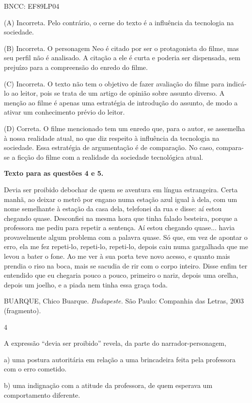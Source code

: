 BNCC: EF89LP04

(A) Incorreta. Pelo contrário, o cerne do texto é a influência da
tecnologia na sociedade.

(B) Incorreta. O personagem Neo é citado por ser o protagonista do
filme, mas seu perfil não é analisado. A citação a ele é curta e poderia
ser dispensada, sem prejuízo para a compreensão do enredo do filme.

(C) Incorreta. O texto não tem o objetivo de fazer avaliação do filme
para indicá-lo ao leitor, pois se trata de um artigo de opinião sobre
assunto diverso. A menção ao filme é apenas uma estratégia de introdução
do assunto, de modo a ativar um conhecimento prévio do leitor.

(D) Correta. O filme mencionado tem um enredo que, para o autor, se
assemelha à nossa realidade atual, no que diz respeito à influência da
tecnologia na sociedade. Essa estratégia de argumentação é de
comparação. No caso, compara-se a ficção do filme com a realidade da
sociedade tecnológica atual.

\textbf{Texto para as questões 4 e 5.}

Devia ser proibido debochar de quem se aventura em língua estrangeira.
Certa manhã, ao deixar o metrô por engano numa estação azul igual à
dela, com um nome semelhante à estação da casa dela, telefonei da rua e
disse: aí estou chegando quase. Desconfiei na mesma hora que tinha
falado besteira, porque a professora me pediu para repetir a sentença.
Aí estou chegando quase... havia provavelmente algum problema com a
palavra quase. Só que, em vez de apontar o erro, ela me fez repeti-lo,
repeti-lo, repeti-lo, depois caiu numa gargalhada que me levou a bater o
fone. Ao me ver à sua porta teve novo acesso, e quanto mais prendia o
riso na boca, mais se sacudia de rir com o corpo inteiro. Disse enfim
ter entendido que eu chegaria pouco a pouco, primeiro o nariz, depois
uma orelha, depois um joelho, e a piada nem tinha essa graça toda.

BUARQUE, Chico Buarque. \emph{Budapeste.} São Paulo: Companhia das
Letras, 2003 (fragmento).

\num{4}

A expressão ``devia ser proibido'' revela, da parte do
narrador-personagem,

a) uma postura autoritária em relação a uma brincadeira feita pela
professora com o erro cometido.

b) uma indignação com a atitude da professora, de quem esperava um
comportamento diferente.

